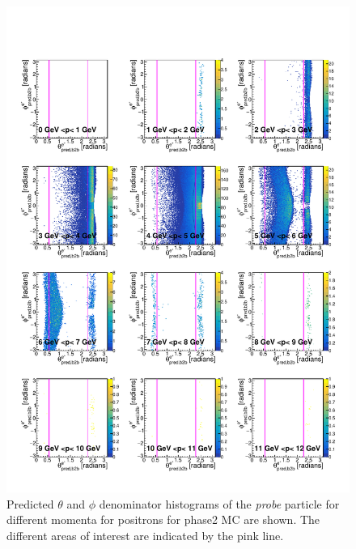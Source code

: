\documentclass[a4paper,11pt,twosided,final,german,openbib,pdftex,listof=totoc,bibliography=totoc]{scrbook}
\begin{document}
\begin{appendix}
\begin{figure}[h!]
	\includegraphics[width=\textwidth]{Plots/master/RTPMepE_MC.pdf}
	\caption[Enumerator $\theta$-$\phi$ Positron Momentum Phase2 MC]{Predicted $\theta$ and $\phi$ denominator histograms of the \textit{probe} particle for different momenta for positrons for phase2 MC are shown. The different areas of interest are indicated by the pink line.}
	\label{plt:RTPMepE_MC}
\end{figure}



\end{appendix}
\end{document}
